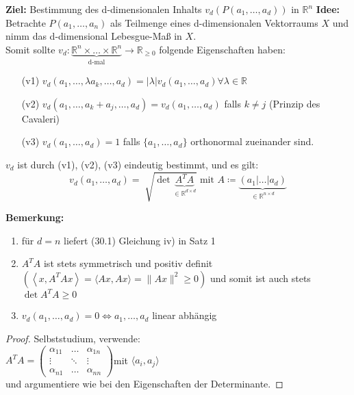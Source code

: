 \textbf{Ziel:} Bestimmung des d-dimensionalen Inhalts 
$v_d (P(a_1, \ldots, a_d))$ in $\mathbb{R}^n $
\textbf{Idee:} Betrachte $P(a_1, \ldots, a_n)$ als Teilmenge eines d-dimensionalen
Vektorraums $X$ und nimm das d-dimensional Lebesgue-Maß in $X$.\\
Somit sollte $v_d: 
\underbrace{\mathbb{R}^n \times \ldots \times \mathbb{R}^n }_{\text{d-mal}}
\rightarrow \mathbb{R}_{\geq 0} $
folgende Eigenschaften haben:
\begin{enumerate}
    \item[(v1)]
        $v_d (a_1, \ldots, \lambda a_k, \ldots, a_d) = |\lambda| v_d(a_1, \ldots, a_d)
        \forall \lambda \in \mathbb{R} $
    \item[(v2)]
        $v_d (a_1, \ldots, a_k + a_j, \ldots, a_d) = v_d(a_1, \ldots, a_d) $
        falls $k \neq j$ (Prinzip des Cavaleri)
    \item[(v3)]
        $v_d(a_1, \ldots, a_d) = 1 $ falls $\lbrace a_1, \ldots, a_d \rbrace $
        orthonormal zueinander sind.
\end{enumerate}

\begin{satz}
    $v_d$ ist durch (v1), (v2), (v3) eindeutig bestimmt, und es gilt:
    \begin{equation}
        v_d(a_1, \ldots, a_d) = 
        \sqrt[]{\det \underbrace{A^T A}_{\in \mathbb{R}^{d \times d}}}
        \text{ mit } 
        A \coloneqq\underbrace{(a_1 | \ldots | a_d)}_{\in \mathbb{R}^{n \times d}}
    \end{equation}
\end{satz}

\textbf{Bemerkung:}
\mbox{}
\begin{enumerate}
    \item
        für $d=n $ liefert (30.1) Gleichung iv) in Satz 1
    \item
        $A^T A $ ist stets symmetrisch und positiv definit
        $\left( \left\langle x, A^T Ax \right\rangle =
        \langle Ax, Ax \rangle = \|Ax\|^2 \geq 0 \right)$
        und somit ist auch stets $\det A^T A \geq 0 $
    \item
        $v_d (a_1, \ldots, a_d) = 0 \Leftrightarrow a_1, \ldots, a_d$ linear abhängig
\end{enumerate}

\begin{proof}
    Selbststudium, verwende:\\
    $A^T A = 
    \begin{pmatrix}
        \alpha_{11} & \ldots & \alpha_{1n} \\
        \vdots      & \ddots & \vdots \\
        \alpha_{n1} & \ldots & \alpha_{nn}
    \end{pmatrix}
    $mit $\langle a_i, a_j \rangle $ \\
    und argumentiere wie bei den Eigenschaften der Determinante.
    
\end{proof}